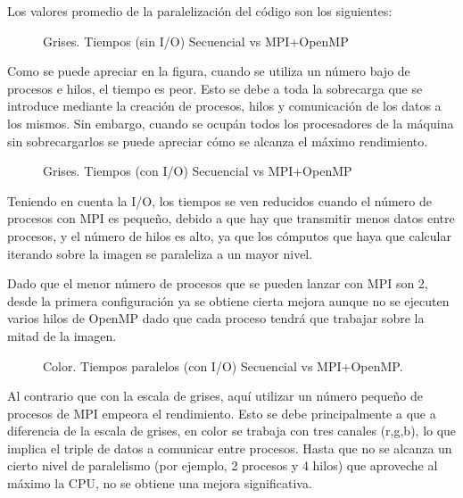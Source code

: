 \documentclass[12pt]{report} %
\begin{document}
Los valores promedio de la paralelización del código son los siguientes:

\begin{figure}[H]
    \makebox[\textwidth][c]{
        
    }
    \caption{Grises. Tiempos (sin I/O) Secuencial vs MPI+OpenMP}
    \label{fig:tiempos_no_io_gris}
\end{figure}

Como se puede apreciar en la figura, cuando se utiliza un número bajo de procesos e hilos, el tiempo es
peor. Esto se debe a toda la sobrecarga que se introduce mediante la creación de procesos, hilos y
comunicación de los datos a los mismos. Sin embargo, cuando se ocupán todos los procesadores de la máquina
sin sobrecargarlos se puede apreciar cómo se alcanza el máximo rendimiento.

\begin{figure}[H]
    \makebox[\textwidth][c]{
        
    }
    \caption{Grises. Tiempos (con I/O) Secuencial vs MPI+OpenMP}
    \label{fig:tiempos_io_gris}
\end{figure}

Teniendo en cuenta la I/O, los tiempos se ven reducidos cuando el número de procesos con MPI es pequeño,
debido a que hay que transmitir menos datos entre procesos, y el número de hilos es alto, ya que los
cómputos que haya que calcular iterando sobre la imagen se paraleliza a un mayor nivel.

Dado que el menor número de procesos que se pueden lanzar con MPI son 2, desde la primera configuración
ya se obtiene cierta mejora aunque no se ejecuten varios hilos de OpenMP dado que cada proceso tendrá que
trabajar sobre la mitad de la imagen.


\begin{figure}[H]
	\makebox[\textwidth][c]{
        
    }
    \caption{Color. Tiempos paralelos (con I/O) Secuencial vs MPI+OpenMP.}
    \label{fig:color_tiempos}
\end{figure}

Al contrario que con la escala de grises, aquí utilizar un número pequeño de procesos de MPI empeora el
rendimiento. Esto se debe principalmente a que a diferencia de la escala de grises, en color se trabaja
con tres canales (r,g,b), lo que implica el triple de datos a comunicar entre procesos. Hasta que no se
alcanza un cierto nivel de paralelismo (por ejemplo, 2 procesos y 4 hilos) que aproveche al máximo la CPU,
no se obtiene una mejora significativa.
\end{document}
